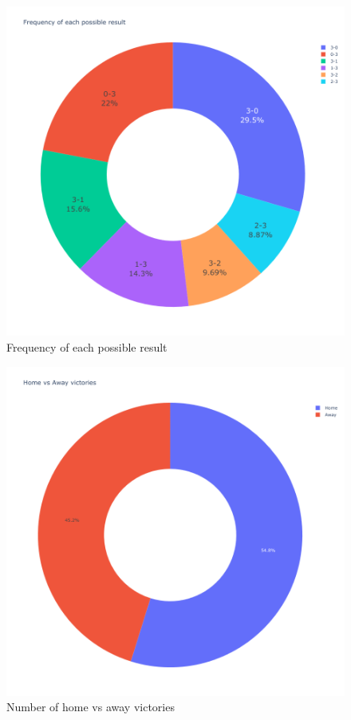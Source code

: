 \begin{figure}
	\centering
	\includegraphics[width=.7\linewidth]{results-pie-chart.png}
	\caption{Frequency of each possible result}
	\label{fig:results-pie-chart}
\end{figure}

\begin{figure}
	\centering
	\includegraphics[width=.7\linewidth]{home-away-victories.png}
	\caption{Number of home vs away victories}
	\label{fig:home-away-victories}
\end{figure}

